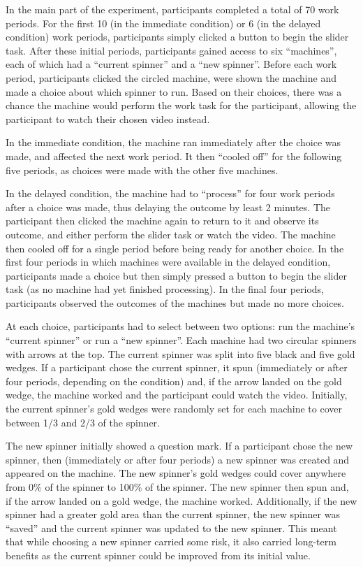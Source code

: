 \documentclass[10pt,letterpaper]{article}
\begin{document}
In the main part of the experiment, participants completed a total of 70 work
periods. For the first 10 (in the immediate condition) or 6 (in the delayed
condition) work periods, participants simply clicked a button to begin the
slider task. After these initial periods, participants gained access to six
``machines'', each of which had a ``current spinner'' and a ``new spinner''.
Before each work period, participants clicked the circled machine,
were shown the machine and made a choice about which spinner to run. Based on their choices, there was a
chance the machine would perform the work task for the participant, allowing the
participant to watch their chosen video instead.

In the immediate condition, the machine ran immediately after the choice was
made, and affected the next work period. It then ``cooled off'' for the
following five periods, as choices were made with the other five machines.

In the delayed condition, the machine had to ``process'' for four work periods
after a choice was made, thus delaying the outcome by least 2 minutes.
The participant then clicked the machine again to
return to it and observe its outcome, and either perform the slider task or
watch the video. The machine then cooled off for a single period before being ready
for another choice. In the first four periods in which machines were available
in the delayed condition, participants made a choice but then simply pressed a
button to begin the slider task (as no machine had yet finished processing). In
the final four periods, participants observed the outcomes of the machines but
made no more choices.

At each choice, participants had to select between two options: run the
machine's ``current spinner'' or run a ``new spinner''. Each machine had two
circular spinners with arrows at the top. The current spinner was split into
five black and five gold wedges. If a participant chose the
current spinner, it spun (immediately or after four periods, depending
on the condition) and, if the arrow landed on the gold wedge, the machine
worked and the participant could watch the video. Initially, the
current spinner's gold wedges were randomly set for each machine to cover between
1/3 and 2/3 of the spinner.

The new spinner initially showed a question mark. If a participant chose the
new spinner, then (immediately or after four periods) a new spinner was
created and appeared on the machine. The new spinner's gold wedges could cover
anywhere from 0\% of the spinner to 100\% of the spinner. The new spinner then
spun and, if the arrow landed on a gold wedge, the machine worked.
Additionally, if the new spinner had a greater gold area than the current
spinner, the new spinner was ``saved'' and the current spinner was
updated to the new spinner.  This meant that
while choosing a new spinner carried some risk, it also carried long-term
benefits as the current spinner could be improved from its initial value.
\end{document}
